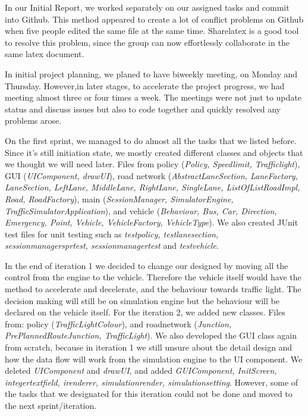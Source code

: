 \documentclass[11pt]{article}
\begin{document}
In our Initial Report, we  worked  separately on our assigned tasks and commit into Github. This method appeared to create a lot of conflict problems on Github when five people edited the same file at the same time. 
Sharelatex is a good tool to resolve this problem, since the group can now effortlessly collaborate in the same latex document. 

In initial project planning, we planed to have biweekly meeting, on Monday and Thursday. However,in later stages, to accelerate the project progress, we had meeting almost three or four times a week. The meetings were not just to update status and discuss issues but also to code together and quickly resolved any problems arose.

On the first sprint,  we managed to do almost all the tasks that we listed before. Since it's still initiation state, we mostly created different classes and objects that we thought we will need later. Files from policy (\textit{Policy, Speedlimit, Trafficlight}), GUI (\textit{UIComponent, drawUI}), road network (\textit{AbstractLaneSection, LaneFactory, LaneSection, LeftLane, MiddleLane, RightLane, SingleLane, ListOfListRoadImpl, Road, RoadFactory}), main (\textit{SessionManager, SimulatorEngine, TrafficSimulatorApplication}), and vehicle (\textit{Behaviour, Bus, Car, Direction, Emergency, Point, Vehicle, VehicleFactory, VehicleType}). We also created JUnit test files for unit testing such as \textit{testpolicy, testlanesection, sessionmanagersprtest, sessionmanagertest} and \textit{testvehicle}. 

In the end of iteration 1 we decided to change our designed by moving all the control from the engine to the vehicle. Therefore the vehicle itself would have the method to accelerate and decelerate, and the behaviour towards traffic light. The decision making will still be on simulation engine but the behaviour will be declared on the vehicle itself. 
For the iteration 2, we added new classes. Files from: policy (\textit{TrafficLightColour}), and roadnetwork (\textit{Junction, PrePlannedRouteJunction, TrafficLight}). We also developed the GUI class again from scratch, because in iteration 1 we still unsure about the detail design and how the data flow will work from the simulation engine to the UI component. We deleted \textit{UIComponent} and \textit{drawUI}, and added \textit{GUIComponent, InitScreen, integertextfield, irenderer, simulationrender, simulationsetting}. However, some of the tasks that we designated for this iteration could not be done and moved to the next sprint/iteration.  
\end{document}
